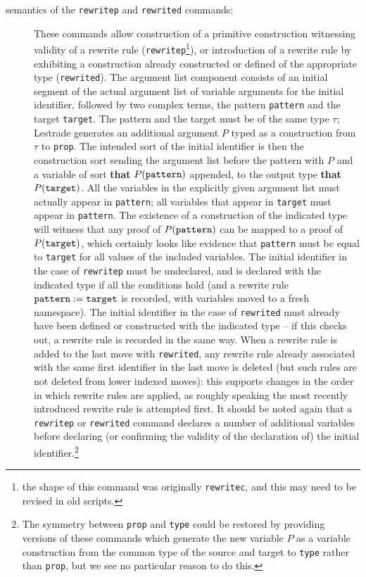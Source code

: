 \documentclass[12pt]{article}
\begin{document}
\begin{description}
\item[semantics of the {\tt rewritep} and {\tt rewrited} commands:]  These commands allow construction of a primitive construction witnessing validity of a rewrite rule ({\tt rewritep}\footnote{the shape of this command was originally {\tt rewritec}, and this may need to be revised in old scripts.}), or introduction of a rewrite rule by exhibiting a construction already constructed or defined of the appropriate type ({\tt rewrited}).  The argument list component consists of an initial segment of the actual argument list of variable arguments for the initial identifier, followed by two complex terms, the pattern {\tt pattern} and the target {\tt target}.  The pattern and the target must be of the same type $\tau$;  Lestrade generates an additional argument $P$ typed as a construction from $\tau$ to {\tt prop}.     The intended sort of the initial identifier is then the construction sort sending the argument list before the pattern  with $P$ and a variable of sort {\bf that} $P({\tt pattern})$ appended, to the output type
{\bf that} $P({\tt target})$.  All the variables in the explicitly given argument list must actually appear in {\tt pattern}; all variables that appear in {\tt target} must appear in {\tt pattern}.  The existence of a construction of the indicated type will witness that any proof of $P({\tt pattern})$ can be mapped to a proof of $P({\tt target})$, which certainly looks like evidence that {\tt pattern} must be equal to {\tt target} for all values of the included variables.  The initial identifier in the case of {\tt rewritep} must be undeclared, and is declared with the indicated type if all the conditions hold (and a rewrite rule ${\tt pattern} := {\tt target}$ is recorded, with variables moved to a fresh namespace).  The initial identifier
in the case of {\tt rewrited} must already have been defined or constructed with the indicated type -- if this checks out, a rewrite rule is recorded in the same way.  When a rewrite rule is added to the last move with {\tt rewrited}, any rewrite rule already associated with the same first identifier in the last move  is deleted (but such rules are not deleted from lower indexed moves):  this supports changes in the order in which rewrite rules are applied, as roughly speaking the most recently introduced rewrite rule is attempted first.  It should be noted again that a {\tt rewritep} or {\tt rewrited} command declares a number of additional variables before declaring (or confirming the validity of the declaration of) the initial identifier.\footnote{The symmetry between {\tt prop} and {\tt type} could be restored by providing versions of these commands which generate the new variable $P$ as a variable construction from the common type of the source and target to {\tt type} rather than {\tt prop}, but we see no particular reason to do this.}

\end{description}
\end{document}
